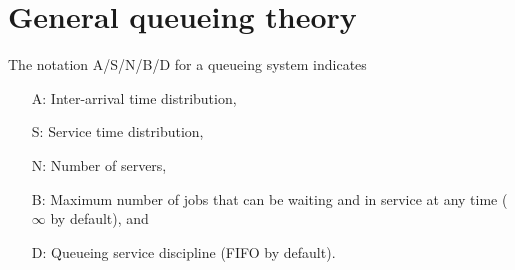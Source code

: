 \documentclass[a4paper,10pt,english]{article}
\begin{document}

\section{General queueing theory}
The notation A/S/N/B/D for a queueing system indicates 
\begin{itemize}
\item[A:] Inter-arrival time distribution, 
\item[S:] Service time distribution, 
\item[N:] Number of servers, 
\item[B:] Maximum number of jobs that can be waiting and in service at any time ($\infty$ by default), and 
\item[D:] Queueing service discipline (FIFO by default). 
\end{itemize}
\end{document}
